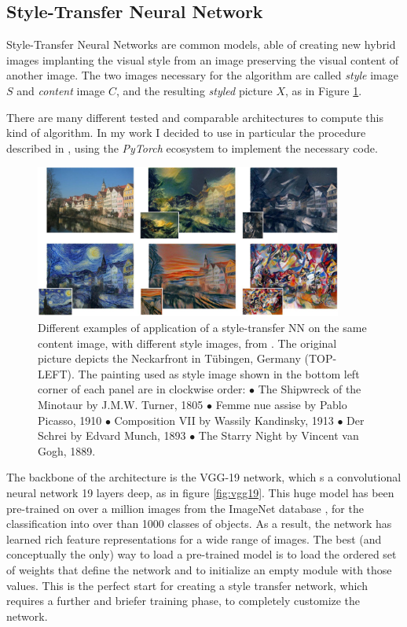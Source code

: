 
\subsection{Style-Transfer Neural Network}
\label{ssec:sttrNN}
Style-Transfer Neural Networks are common models, able of creating new hybrid images implanting the visual style from an image preserving the visual content of another image. The two images necessary for the algorithm are called \textit{style} image $S$ and \textit{content} image $C$, and the resulting \textit{styled} picture $X$, as in Figure \ref{fig:ex_st_tr}.

There are many different tested and comparable architectures to compute this kind of algorithm. In my work I decided to use in particular the procedure described in \cite{1508.06576}, using the \textit{PyTorch} ecosystem to implement the necessary code.

\begin{figure}
    \centering
    \includegraphics[width = 0.9\textwidth]{images/st_trasf_ex}
    \caption{Different examples of application of a style-transfer NN on the same content image, with different style images, from \cite{1508.06576}. The
original picture depicts the Neckarfront in Tübingen, Germany (TOP-LEFT). The painting used as style image shown in the bottom left corner of each panel are in clockwise order: $\bullet$ The Shipwreck of the Minotaur by J.M.W. Turner, 1805 $\bullet$ Femme nue assise by Pablo Picasso, 1910 $\bullet$ Composition VII by Wassily Kandinsky, 1913 $\bullet$ Der Schrei by Edvard Munch, 1893 $\bullet$ The Starry Night by Vincent van Gogh, 1889.}
    \label{fig:ex_st_tr}
\end{figure}

The backbone of the architecture is the VGG-19 network, which s a convolutional neural network 19 layers deep, as in figure \ref{fig:vgg19}. This huge model has been pre-trained on over a million images from the ImageNet database \cite{imagenet_cvpr09}, for the classification into over than 1000 classes of objects. As a result, the network has learned rich feature representations for a wide range of images. The best (and conceptually the only) way to load a pre-trained model is to load the ordered set of weights that define the network and to initialize an empty module with those values. This is the perfect start for creating a style transfer network, which requires a further and briefer training phase, to completely customize the network.

